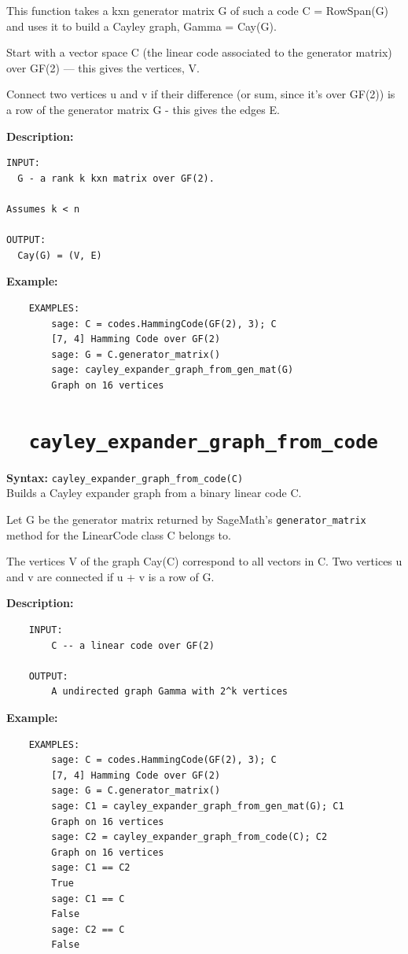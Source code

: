 \documentclass{article}
\begin{document}
This function takes a kxn generator matrix G of such a code C = RowSpan(G)
and uses it to build a Cayley graph, Gamma = Cay(G).


Start with a vector space C (the linear code associated to the generator matrix)
over GF(2) — this gives the vertices, V.

Connect two vertices u and v if their difference (or sum, since it’s over GF(2))
is a row of the generator matrix G - this gives the edges E.


\textbf{Description:}
\begin{verbatim}
INPUT:
  G - a rank k kxn matrix over GF(2).

Assumes k < n  

OUTPUT:
  Cay(G) = (V, E)
\end{verbatim}

\textbf{Example:}
\begin{verbatim}
    EXAMPLES:
        sage: C = codes.HammingCode(GF(2), 3); C
        [7, 4] Hamming Code over GF(2)
        sage: G = C.generator_matrix()
        sage: cayley_expander_graph_from_gen_mat(G)
        Graph on 16 vertices
\end{verbatim}

\section{\tt \ \ cayley\_expander\_graph\_from\_code}

\textbf{Syntax:} \verb}cayley_expander_graph_from_code(C)}\\

Builds a Cayley expander graph from a binary linear code C.

Let G be the generator matrix returned by SageMath's 
    {\tt generator\_matrix} method for the LinearCode class C belongs to.

    The vertices V of the graph Cay(C) correspond to all vectors in C. 
    Two vertices u and v are connected if u + v is a row of G.
    
\textbf{Description:}
\begin{verbatim}
    INPUT:
        C -- a linear code over GF(2)

    OUTPUT:
        A undirected graph Gamma with 2^k vertices
\end{verbatim}

\textbf{Example:}
\begin{verbatim}
    EXAMPLES:
        sage: C = codes.HammingCode(GF(2), 3); C
        [7, 4] Hamming Code over GF(2)
        sage: G = C.generator_matrix()
        sage: C1 = cayley_expander_graph_from_gen_mat(G); C1
        Graph on 16 vertices
        sage: C2 = cayley_expander_graph_from_code(C); C2
        Graph on 16 vertices
        sage: C1 == C2
        True
        sage: C1 == C
        False
        sage: C2 == C
        False
\end{verbatim}
\end{document}
